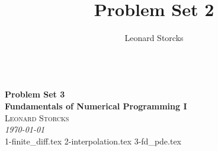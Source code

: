 \documentclass[a4paper, 12pt]{article}
\title{Problem Set 2}
\author{Leonard Storcks}
\theoremstyle{definition}
\begin{document}
\pagestyle{plain}
{\noindent\Huge\bf  \\[0.5\baselineskip] {\selectfont  Problem Set 3}}\\[2\baselineskip]
{ {\bf {}\selectfont Fundamentals of Numerical Programming I}\\
{\textsc{Leonard Storcks}} \\
{\textit{\selectfont     \today}}}
\\[1.4\baselineskip] 


{1-finite_diff.tex}
{2-interpolation.tex}
{3-fd_pde.tex}


\pagebreak
\thispagestyle{plain}
\printbibliography[title={References}]
\pagebreak

\end{document}
